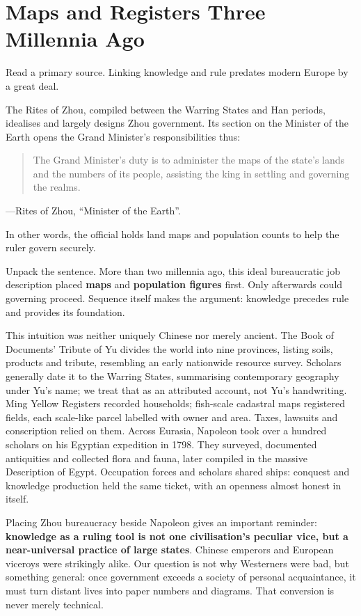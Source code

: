 \section{Maps and Registers Three Millennia Ago}
Read a primary source. Linking knowledge and rule predates modern Europe by a great deal.

The Rites of Zhou, compiled between the Warring States and Han periods, idealises and largely designs Zhou government. Its section on the Minister of the Earth opens the Grand Minister's responsibilities thus:

\begin{quote}
The Grand Minister's duty is to administer the maps of the state's lands and the numbers of its people, assisting the king in settling and governing the realms.
\end{quote}
---Rites of Zhou, ``Minister of the Earth''.

In other words, the official holds land maps and population counts to help the ruler govern securely.

Unpack the sentence. More than two millennia ago, this ideal bureaucratic job description placed \textbf{maps} and \textbf{population figures} first. Only afterwards could governing proceed. Sequence itself makes the argument: knowledge precedes rule and provides its foundation.

This intuition was neither uniquely Chinese nor merely ancient. The Book of Documents' Tribute of Yu divides the world into nine provinces, listing soils, products and tribute, resembling an early nationwide resource survey. Scholars generally date it to the Warring States, summarising contemporary geography under Yu's name; we treat that as an attributed account, not Yu's handwriting. Ming Yellow Registers recorded households; fish-scale cadastral maps registered fields, each scale-like parcel labelled with owner and area. Taxes, lawsuits and conscription relied on them. Across Eurasia, Napoleon took over a hundred scholars on his Egyptian expedition in 1798. They surveyed, documented antiquities and collected flora and fauna, later compiled in the massive Description of Egypt. Occupation forces and scholars shared ships: conquest and knowledge production held the same ticket, with an openness almost honest in itself.

Placing Zhou bureaucracy beside Napoleon gives an important reminder: \textbf{knowledge as a ruling tool is not one civilisation's peculiar vice, but a near-universal practice of large states}. Chinese emperors and European viceroys were strikingly alike. Our question is not why Westerners were bad, but something general: once government exceeds a society of personal acquaintance, it must turn distant lives into paper numbers and diagrams. That conversion is never merely technical.


